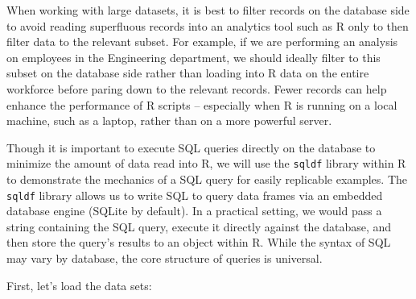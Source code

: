 \documentclass[
]{book}
\begin{document}
When working with large datasets, it is best to filter records on the database side to avoid reading superfluous records into an analytics tool such as R only to then filter data to the relevant subset. For example, if we are performing an analysis on employees in the Engineering department, we should ideally filter to this subset on the database side rather than loading into R data on the entire workforce before paring down to the relevant records. Fewer records can help enhance the performance of R scripts -- especially when R is running on a local machine, such as a laptop, rather than on a more powerful server.

Though it is important to execute SQL queries directly on the database to minimize the amount of data read into R, we will use the \texttt{sqldf} library within R to demonstrate the mechanics of a SQL query for easily replicable examples. The \texttt{sqldf} library allows us to write SQL to query data frames via an embedded database engine (SQLite by default). In a practical setting, we would pass a string containing the SQL query, execute it directly against the database, and then store the query's results to an object within R. While the syntax of SQL may vary by database, the core structure of queries is universal.

First, let's load the data sets:
\end{document}
